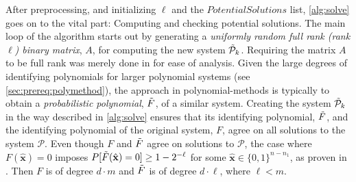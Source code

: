 After preprocessing, and initializing $\ell$ and the $PotentialSolutions$ list, \cref{alg:solve} goes on to the vital part: Computing and checking potential solutions. The main loop of the algorithm starts out by generating a \textit{uniformly random full rank (rank $\ell$) binary matrix}, $A$, for computing the new system $\Tilde{\mathcal{P}}_k$. Requiring the matrix $A$ to be full rank was merely done in \cite{cryptoeprint:2021/578} for ease of analysis. Given the large degrees of identifying polynomials for larger polynomial systems (see \cref{sec:prereq:polymethod}), the approach in polynomial-methods is typically to obtain a \textit{probabilistic polynomial}, $\Tilde{F}$, of a similar system. Creating the system $\Tilde{\mathcal{P}}_k$ in the way described in \cref{alg:solve} ensures that its identifying polynomial, $\Tilde{F}$, and the identifying polynomial of the original system, $F$, agree on all solutions to the system $\mathcal{P}$. Even though $F$ and $\Tilde{F}$ agree on solutions to $\mathcal{P}$, the case where $F(\hat{\mathbf{x}}) = 0$ imposes $P[\Tilde{F}(\hat{\mathbf{x}}) = 0] \geq 1 - 2^{-\ell}$ for some $\hat{\mathbf{x}} \in \{0,1\}^{n - n_1}$, as proven in \cite{cryptoeprint:2021/578}. Then $F$ is of degree $d \cdot m$ and $\Tilde{F}$ is of degree $d \cdot \ell$, where $\ell < m$.

